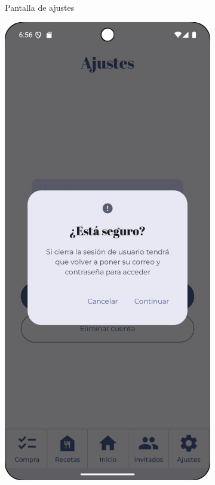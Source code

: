 \begin{figure}[H]
\begin{subfigure}[b]{0.3\textwidth}
      \caption{Pantalla de ajustes}
      \label{fig:settings}
    \end{subfigure}
    \hfill
    \begin{subfigure}[b]{0.3\textwidth}
      \includegraphics[width=\textwidth]{./img/manual/sign_out_confirm.png}

\end{subfigure}
\end{figure}
